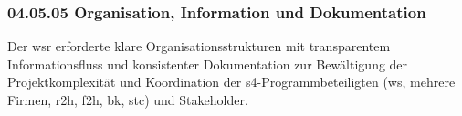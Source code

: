\subsubsection*{04.05.05 Organisation, Information und Dokumentation} 
\label{sec:04.05.05.OrganisationInformationDokumentation}

\par Der \gls{wsr} erforderte klare Organisationsstrukturen mit transparentem Informationsfluss und konsistenter Dokumentation zur Bewältigung der Projektkomplexität und Koordination der \gls{s4}-Programmbeteiligten (\gls{ws}, mehrere Firmen, \gls{r2h}, \gls{f2h}, \gls{bk}, \gls{stc}) und Stakeholder.
